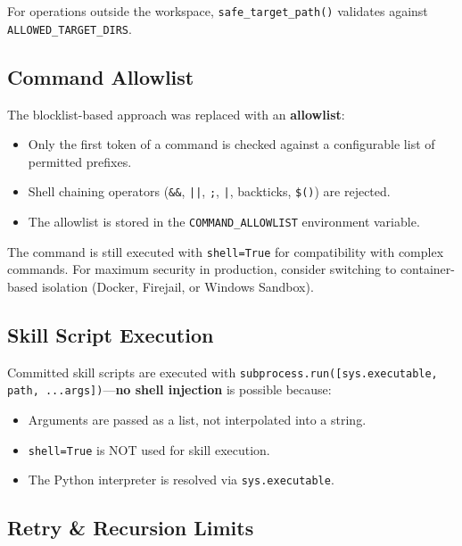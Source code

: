 \documentclass[11pt,a4paper]{article}
\begin{document}
For operations outside the workspace, \texttt{safe\_target\_path()} validates against \texttt{ALLOWED\_TARGET\_DIRS}.

\subsection{Command Allowlist}

The blocklist-based approach was replaced with an \textbf{allowlist}:

\begin{itemize}[leftmargin=*]
  \item Only the first token of a command is checked against a configurable list of permitted prefixes.
  \item Shell chaining operators (\texttt{\&\&}, \texttt{||}, \texttt{;}, \texttt{|}, backticks, \texttt{\$()}) are rejected.
  \item The allowlist is stored in the \texttt{COMMAND\_ALLOWLIST} environment variable.
\end{itemize}

\begin{warningbox}
The command is still executed with \texttt{shell=True} for compatibility with complex commands.  For maximum security in production, consider switching to container-based isolation (Docker, Firejail, or Windows Sandbox).
\end{warningbox}

\subsection{Skill Script Execution}

Committed skill scripts are executed with \texttt{subprocess.run([sys.executable, path, ...args])}---\textbf{no shell injection} is possible because:

\begin{itemize}[leftmargin=*]
  \item Arguments are passed as a list, not interpolated into a string.
  \item \texttt{shell=True} is NOT used for skill execution.
  \item The Python interpreter is resolved via \texttt{sys.executable}.
\end{itemize}

\subsection{Retry \& Recursion Limits}
\end{document}
